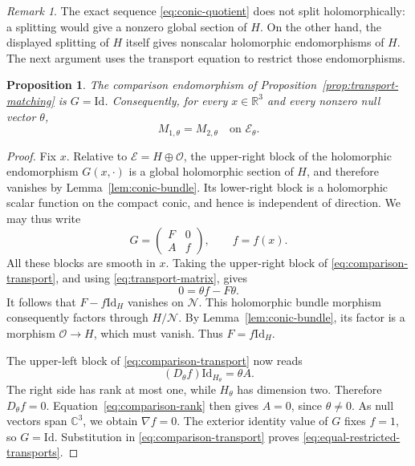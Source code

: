 \documentclass[11pt]{article}
\newcommand{\R}{\mathbb R}
\newcommand{\C}{\mathbb C}
\newcommand{\Id}{\mathrm{Id}}
\newcommand{\Ecal}{\mathcal E}
\newtheorem{proposition}[theorem]{Proposition}
\theoremstyle{remark}
\newtheorem{remark}[theorem]{Remark}
\numberwithin{equation}{section}
\begin{document}
\begin{remark}
The exact sequence \eqref{eq:conic-quotient} does not split holomorphically:
a splitting would give a nonzero global section of $H$.  On the other
hand, the displayed splitting of $H$ itself gives nonscalar holomorphic
endomorphisms of $H$.  The next argument uses the transport equation to
restrict those endomorphisms.
\end{remark}

\begin{proposition}\label{prop:comparison-rigidity}
The comparison endomorphism of
Proposition~\ref{prop:transport-matching} is $G=\Id$.  Consequently, for
every $x\in\R^3$ and every nonzero null vector $\theta$,
\begin{equation}\label{eq:equal-restricted-transports}
 M_{1,\theta}=M_{2,\theta}\quad\text{on }\Ecal_\theta.
\end{equation}
\end{proposition}

\begin{proof}
Fix $x$.  Relative to $\Ecal=H\oplus\mathcal O$, the upper-right block
of the holomorphic endomorphism $G(x,\cdot)$ is a global holomorphic
section of $H$, and therefore vanishes by Lemma~\ref{lem:conic-bundle}.
Its lower-right block is a holomorphic scalar function on the compact
conic, and hence is independent of direction.  We may thus write
\[
 G=\begin{pmatrix}F&0\\ A&f\end{pmatrix},\qquad f=f(x).
\]
All these blocks are smooth in $x$.  Taking the upper-right block of
\eqref{eq:comparison-transport}, and using
\eqref{eq:transport-matrix}, gives
\[
 0=\theta f-F\theta.
\]
It follows that $F-f\Id_H$ vanishes on $\mathcal N$.  This holomorphic
bundle morphism consequently factors through $H/\mathcal N$.  By
Lemma~\ref{lem:conic-bundle}, its factor is a morphism
$\mathcal O\to H$, which must vanish.  Thus $F=f\Id_H$.

The upper-left block of \eqref{eq:comparison-transport} now reads
\begin{equation}\label{eq:comparison-rank}
 (D_\theta f)\Id_{H_\theta}=\theta A.
\end{equation}
The right side has rank at most one, while $H_\theta$ has dimension two.
Therefore $D_\theta f=0$.  Equation~\eqref{eq:comparison-rank} then gives
$A=0$, since $\theta\ne0$.  As null vectors span $\C^3$, we obtain
$\nabla f=0$.  The exterior identity value of $G$ fixes $f=1$, so $G=\Id$.
Substitution in \eqref{eq:comparison-transport} proves
\eqref{eq:equal-restricted-transports}.
\end{proof}
\end{document}

